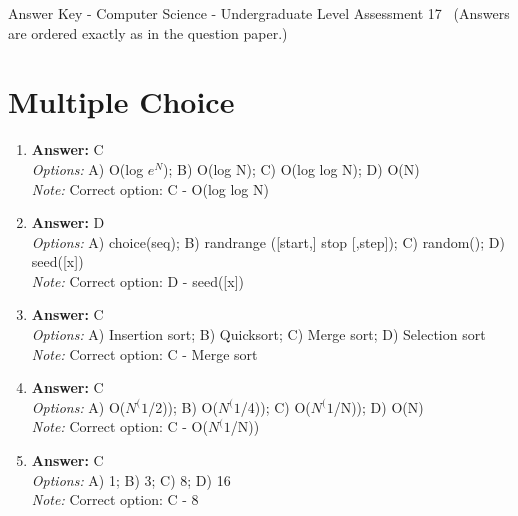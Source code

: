 \documentclass[12pt]{article}
\begin{document}
\begin{center}
Answer Key - Computer Science - Undergraduate Level Assessment 17 \
\small (Answers are ordered exactly as in the question paper.)
\end{center}

\section*{Multiple Choice}
\begin{enumerate}[label=\arabic*.]
\item \textbf{Answer:} C
\\ \textit{Options:} A) O(log $e^N$); B) O(log N); C) O(log log N); D) O(N)
\\ \textit{Note:} Correct option: C - O(log log N)
\item \textbf{Answer:} D
\\ \textit{Options:} A) choice(seq); B) randrange ([start,] stop [,step]); C) random(); D) seed([x])
\\ \textit{Note:} Correct option: D - seed([x])
\item \textbf{Answer:} C
\\ \textit{Options:} A) Insertion sort; B) Quicksort; C) Merge sort; D) Selection sort
\\ \textit{Note:} Correct option: C - Merge sort
\item \textbf{Answer:} C
\\ \textit{Options:} A) O($N^(1$/2)); B) O($N^(1$/4)); C) O($N^(1$/N)); D) O(N)
\\ \textit{Note:} Correct option: C - O($N^(1$/N))
\item \textbf{Answer:} C
\\ \textit{Options:} A) 1; B) 3; C) 8; D) 16
\\ \textit{Note:} Correct option: C - 8
\end{enumerate}
\end{document}
